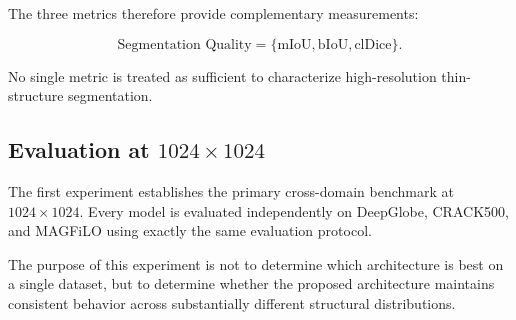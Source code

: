 \documentclass[11pt,a4paper]{article}
\begin{document}
The three metrics therefore provide complementary measurements:

\begin{equation}
\text{Segmentation Quality}
=
\{\text{mIoU},\text{bIoU},\text{clDice}\}.
\end{equation}

No single metric is treated as sufficient to characterize high-resolution 
thin-structure segmentation.


\subsection{Evaluation at $1024\times1024$}

The first experiment establishes the primary cross-domain benchmark at 
$1024\times1024$. Every model is evaluated independently on DeepGlobe, 
CRACK500, and MAGFiLO using exactly the same evaluation protocol.

The purpose of this experiment is not to determine which architecture is 
best on a single dataset, but to determine whether the proposed architecture 
maintains consistent behavior across substantially different structural 
distributions.
\end{document}
